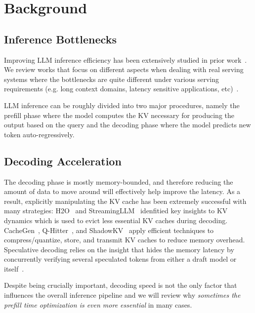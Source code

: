 \section{Background}

\subsection{Inference Bottlenecks}

Improving LLM inference efficiency has been extensively studied in prior work~\cite{miao2023efficientgenerativelargelanguage, yuan2024llminferenceunveiledsurvey}. We review works that focus on different aspects when dealing with real serving systems where the bottlenecks are quite different under various serving requirements (e.g. long context domains, latency sensitive applications, etc)~\cite{kwon2023efficient, zheng2024sglangefficientexecutionstructured}. 

LLM inference can be roughly divided into two major procedures, namely the prefill phase where the model computes the KV necessary for producing the output based on the query and the decoding phase where the model predicts new token auto-regressively. 

\subsection{Decoding Acceleration}
The decoding phase is mostly memory-bounded, and therefore reducing the amount of data to move around will effectively help improve the latency. As a result, explicitly manipulating the KV cache has been extremely successful with many strategies: H2O~\cite{zhang2023h2oheavyhitteroracleefficient} and StreamingLLM~\cite{xiao2024efficientstreaminglanguagemodels} idenfitied key insights to KV dynamics which is used to evict less essential KV caches during decoding. CacheGen~\cite{liu2024cachegenkvcachecompression}, Q-Hitter~\cite{qhitter}, and ShadowKV~\cite{sun2024shadowkvkvcacheshadows} apply efficient techniques to compress/quantize, store, and transmit KV caches to reduce memory overhead. Speculative decoding relies on the insight that hides the memory latency by concurrently verifying several speculated tokens from either a draft model or itself~\cite{leviathan2023fastinferencetransformersspeculative, zhang2024draftverifylossless, xia2024unlockingefficiencylargelanguage}.  

Despite being crucially important, decoding speed is not the only factor that influences the overall inference pipeline and we will review why \textit{sometimes the prefill time optimization is even more essential} in many cases. 

